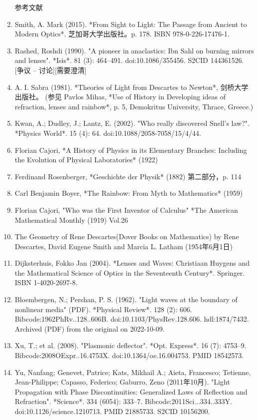 \begin{enumerate}
参考文献  
\item Smith, A. Mark (2015). *From Sight to Light: The Passage from Ancient to Modern Optics*. 芝加哥大学出版社。p. 178. ISBN 978-0-226-17476-1.  
\item Rashed, Roshdi (1990). "A pioneer in anaclastics: Ibn Sahl on burning mirrors and lenses". *Isis*. 81 (3): 464–491. doi:10.1086/355456. S2CID 144361526. [争议 – 讨论][需要澄清]  
\item A. I. Sabra (1981). *Theories of Light from Descartes to Newton*, 剑桥大学出版社。 (参见 Pavlos Mihas, *Use of History in Developing ideas of refraction, lenses and rainbow*, p. 5, Demokritus University, Thrace, Greece.)  
\item Kwan, A.; Dudley, J.; Lantz, E. (2002). "Who really discovered Snell's law?". *Physics World*. 15 (4): 64. doi:10.1088/2058-7058/15/4/44.  
\item Florian Cajori, *A History of Physics in its Elementary Branches: Including the Evolution of Physical Laboratories* (1922)  
\item Ferdinand Rosenberger, *Geschichte der Physik* (1882) 第二部分，p. 114  
\item Carl Benjamin Boyer, *The Rainbow: From Myth to Mathematics* (1959)   
\item Florian Cajori, "Who was the First Inventor of Calculus" *The American Mathematical Monthly (1919) Vol.26  
\item The Geometry of Rene Descartes(Dover Books on Mathematics) by Rene Descartes, David Eugene Smith and Marcia L. Latham (1954年6月1日)  
\item Dijksterhuis, Fokko Jan (2004). *Lenses and Waves: Christiaan Huygens and the Mathematical Science of Optics in the Seventeenth Century*. Springer. ISBN 1-4020-2697-8.  
\item Bloembergen, N.; Pershan, P. S. (1962). "Light waves at the boundary of nonlinear media" (PDF). *Physical Review*. 128 (2): 606. Bibcode:1962PhRv..128..606B. doi:10.1103/PhysRev.128.606. hdl:1874/7432. Archived (PDF) from the original on 2022-10-09.  
\item Xu, T.; et al. (2008). "Plasmonic deflector". *Opt. Express*. 16 (7): 4753–9. Bibcode:2008OExpr..16.4753X. doi:10.1364/oe.16.004753. PMID 18542573.  
\item Yu, Nanfang; Genevet, Patrice; Kats, Mikhail A.; Aieta, Francesco; Tetienne, Jean-Philippe; Capasso, Federico; Gaburro, Zeno (2011年10月). "Light Propagation with Phase Discontinuities: Generalized Laws of Reflection and Refraction". *Science*. 334 (6054): 333–7. Bibcode:2011Sci...334..333Y. doi:10.1126/science.1210713. PMID 21885733. S2CID 10156200.

\end{enumerate}
